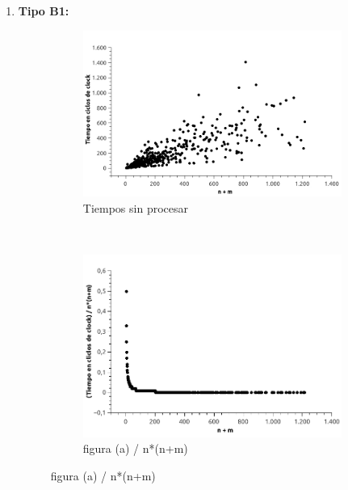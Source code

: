 \begin{enumerate}
\item \textbf{Tipo B1:}

\begin{figure}[H]
        \centering
        \begin{subfigure}[b]{0.5\textwidth}
                \includegraphics[width=\textwidth]{imagenes/ejer4-grafB1-1.jpg}
                \caption{Tiempos sin procesar}
        \end{subfigure}%
        ~ %
        \begin{subfigure}[b]{0.5\textwidth}
                \includegraphics[width=\textwidth]{imagenes/ejer4-grafB1-2.jpg}
                \caption{figura (a) / n*(n+m)}
        \end{subfigure}


\end{figure}
\end{enumerate}
